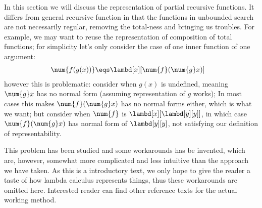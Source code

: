 \documentclass[../../../include/open-logic-section]{subfiles}
\begin{document}

In this section we will discuss the representation of partial
recursive functions. It differs from general recursive function in
that the functions in unbounded search are not necessarily
regular, removing the total-ness and bringing us troubles. For example, we may want to
reuse the representation of composition of total
functions; for simplicity let's only consider the case of one inner
function of one argument:
\begin{align*}
  \num{f(g(x))} &\eqs \lambd[x][\num{f} (\num{g} x)]
\end{align*}
however this is problematic: consider when $g(x)$ is
undefined, meaning $\num{g} x$ has no normal
form (assuming representation of $g$ works); In most cases this makes
$\num{f} (\num{g} x)$ has no normal forms either, which is what we want; but consider when
$\num{f}$ is $\lambd[x][\lambd[y][y]]$, in which case $\num{f}
(\num{g} x)$ has normal form of $\lambd[y][y]$, not
satisfying our definition of representability.

This problem has been studied and some workarounds has be invented, 
which are, however, somewhat more complicated and less intuitive than the
approach we have taken. As this is a introductory text, we only hope to
give the reader a taste of how lambda calculus represents things, thus
these workarounds are omitted here. Interested reader can find other
reference texts for the actual working method.
\end{document}
